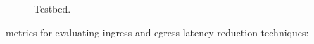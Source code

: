 \begin{figure}[!tb]
\centering
{}
\caption{Testbed.}\label{testbed}
\end{figure}

\fi







\iffalse
metrics for evaluating ingress and egress latency reduction techniques:

